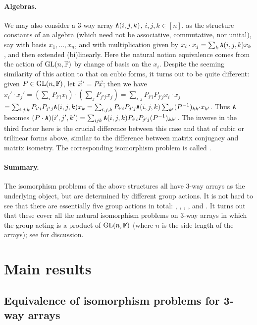 \paragraph{Algebras.} We may also consider a 3-way array 
$\mathtt{A}(i,j,k)$, $i, j, 
k\in[n]$, as the structure 
constants of an algebra (which need not be associative, commutative, nor unital), 
say with basis $x_1, \dotsc, x_n$, and with multiplication given by $x_i \cdot x_j 
= \sum_k \mathtt{A}(i,j,k) x_k$, and then extended (bi)linearly. Here the natural notion 
equivalence comes from the action of $\mathrm{GL}(n,\mathbb{F})$ by change of basis on the $x_i$. 
Despite the seeming similarity of this action to that on cubic forms, it turns out 
to be quite different: given $P \in \mathrm{GL}(n,\mathbb{F})$, let $\vec{x}' = P\vec{x}$; then we 
have $x_i' \cdot x_j' = (\sum_{i} P_{i' i} x_i)\cdot (\sum_{j} P_{j' j} x_j) 
 = \sum_{i,j} P_{i' i} P_{j' j} x_i \cdot x_j$ 
 $= \sum_{i,j,k} P_{i' i} P_{j' j} \mathtt{A}(i,j,k) x_k = \sum_{i,j,k} P_{i' i} P_{j' j} 
 \mathtt{A}(i,j,k) \sum_{k'} (P^{-1})_{kk'} x_{k'}$.
Thus $\mathtt{A}$ becomes $(P \cdot \mathtt{A})(i',j',k') = \sum_{ijk} \mathtt{A}(i,j,k) P_{i' i} P_{j' j} 
(P^{-1})_{k k'}$. The inverse in the third factor here is the crucial difference 
between this case and that of cubic or trilinear forms above, 
similar to the difference between matrix conjugacy and matrix isometry. The 
corresponding isomorphism problem is called \AlgIsolong.

\paragraph{Summary.} 
The isomorphism problems of the above structures all have 3-way arrays as the 
underlying object, but are determined by different group actions. It is not hard to 
see that there are 
essentially five group actions in total: \ThreeTIlong, \MatSpConjlong, 
\MatSpIsomlong, \NcCubicFormlong, and  .
It turns out that these cover all the natural isomorphism problems on 3-way arrays 
in which the group acting is a product of $\mathrm{GL}(n,\mathbb{F})$ (where $n$ is the side 
length of the arrays); see 
 for discussion.


\section{Main results}\label{sec:result}

\subsection{Equivalence of isomorphism problems for 3-way arrays} 

